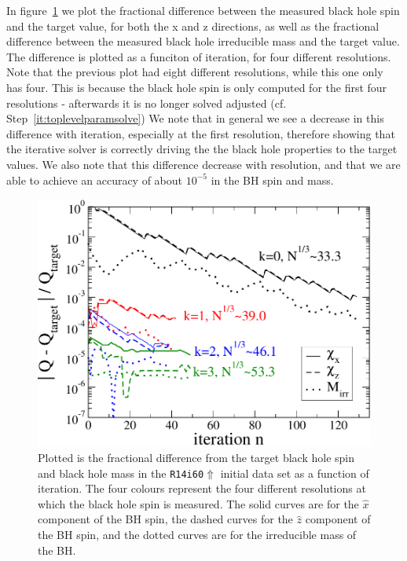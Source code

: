 In figure~\ref{Fig:BHSpinConv} we plot the fractional difference between the measured black hole spin and the target value, for both the x and z directions, as well as the fractional difference between
the measured black hole irreducible mass and the target value. The
difference is plotted as a funciton of iteration, for four different
resolutions. Note that the previous plot had eight different
resolutions, while this one only has four. This is because the black
hole spin is only computed for the first four resolutions - afterwards
it is no longer solved adjusted (cf. Step~\ref{it:toplevelparamsolve}) We note that in general we see a decrease in this difference with iteration, especially at the first resolution, therefore showing that the iterative solver is correctly driving the the black hole properties to the target values.
We also note that this difference decrease with resolution, and that
we are able to achieve an accuracy of about $10^{-5}$ in the BH spin
and mass. 

\begin{figure}
\includegraphics[width=0.95\columnwidth]{chap4/BHSpinConv}
\caption[Convergence of black hole spin and
mass.]{\label{Fig:BHSpinConv}Plotted is the fractional difference from the target black hole spin and black hole mass in the {\tt R14i60$\Uparrow$} initial data set as a function of iteration. The four colours represent 
the four different resolutions at which the black hole spin is measured. The solid curves are for the $\hat{x}$ component of the BH spin, the dashed curves for the $\hat{z}$ component of the BH spin, and
the dotted curves are for the irreducible mass of the BH.}
\end{figure}

